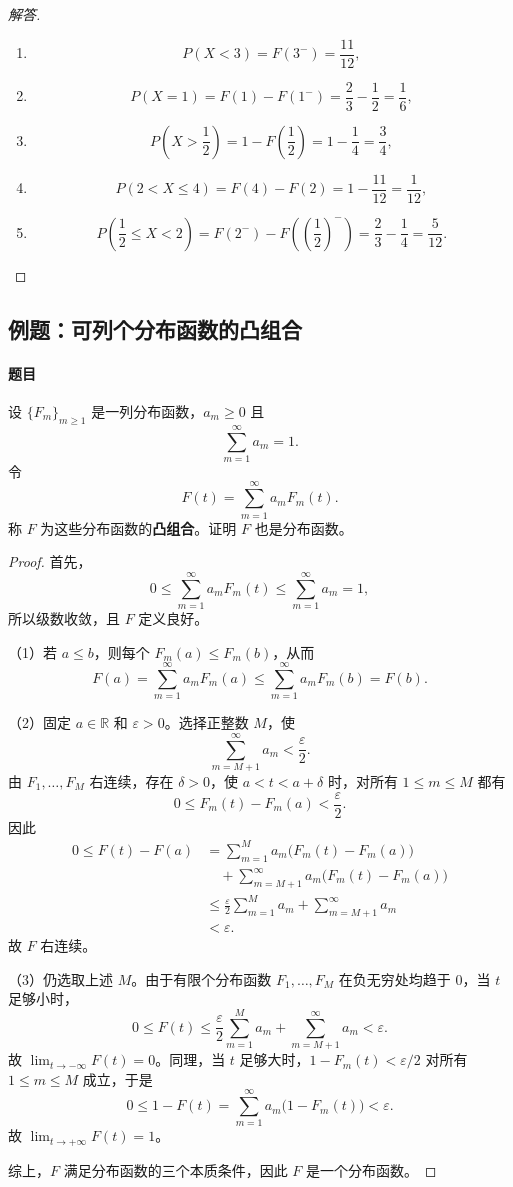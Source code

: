 \begin{proof}[解答]
\begin{enumerate}
\item \[
P(X<3)=F(3^-)=\frac{11}{12},
\]
\item \[
P(X=1)=F(1)-F(1^-)=\frac23-\frac12=\frac16,
\]
\item \[
P\left(X>\frac12\right)=1-F\left(\frac12\right)
=1-\frac14=\frac34,
\]
\item \[
P(2<X\leq4)=F(4)-F(2)=1-\frac{11}{12}=\frac1{12},
\]
\item \[
P\left(\frac12\leq X<2\right)
=F(2^-)-F\left(\left(\frac12\right)^-\right)
=\frac23-\frac14=\frac5{12}.
\]
\end{enumerate}
\end{proof}

\subsection{例题：可列个分布函数的凸组合}\label{note:c2:e3}
\paragraph{题目}
设 $\{F_m\}_{m\geq1}$ 是一列分布函数，$a_m\geq0$ 且
\[
\sum_{m=1}^{\infty}a_m=1.
\]
令
\[
F(t)=\sum_{m=1}^{\infty}a_mF_m(t).
\]
称 $F$ 为这些分布函数的\textbf{凸组合}。证明 $F$ 也是分布函数。

\begin{proof}
首先，
\[
0\leq\sum_{m=1}^{\infty}a_mF_m(t)
\leq\sum_{m=1}^{\infty}a_m=1,
\]
所以级数收敛，且 $F$ 定义良好。

（1）若 $a\leq b$，则每个 $F_m(a)\leq F_m(b)$，从而
\[
F(a)=\sum_{m=1}^{\infty}a_mF_m(a)
\leq\sum_{m=1}^{\infty}a_mF_m(b)=F(b).
\]

（2）固定 $a\in\mathbb R$ 和 $\varepsilon>0$。选择正整数 $M$，使
\[
\sum_{m=M+1}^{\infty}a_m<\frac{\varepsilon}{2}.
\]
由 $F_1,\ldots,F_M$ 右连续，存在 $\delta>0$，使 $a<t<a+\delta$ 时，对所有 $1\leq m\leq M$ 都有
\[
0\leq F_m(t)-F_m(a)<\frac{\varepsilon}{2}.
\]
因此
\[
\begin{aligned}
0\leq F(t)-F(a)
&=\sum_{m=1}^{M}a_m\bigl(F_m(t)-F_m(a)\bigr)\\
&\quad+\sum_{m=M+1}^{\infty}a_m\bigl(F_m(t)-F_m(a)\bigr)\\
&\leq\frac{\varepsilon}{2}\sum_{m=1}^{M}a_m
+\sum_{m=M+1}^{\infty}a_m\\
&<\varepsilon.
\end{aligned}
\]
故 $F$ 右连续。

（3）仍选取上述 $M$。由于有限个分布函数 $F_1,\ldots,F_M$ 在负无穷处均趋于 $0$，当 $t$ 足够小时，
\[
0\leq F(t)
\leq\frac{\varepsilon}{2}\sum_{m=1}^{M}a_m
+\sum_{m=M+1}^{\infty}a_m
<\varepsilon.
\]
故 $\lim_{t\to-\infty}F(t)=0$。同理，当 $t$ 足够大时，$1-F_m(t)<\varepsilon/2$ 对所有 $1\leq m\leq M$ 成立，于是
\[
0\leq1-F(t)
=\sum_{m=1}^{\infty}a_m\bigl(1-F_m(t)\bigr)
<\varepsilon.
\]
故 $\lim_{t\to+\infty}F(t)=1$。

综上，$F$ 满足分布函数的三个本质条件，因此 $F$ 是一个分布函数。
\end{proof}

